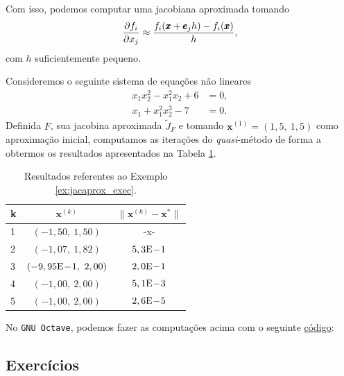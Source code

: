 Com isso, podemos computar uma jacobiana aproximada tomando
\begin{equation}
  \frac{\partial f_i}{\partial x_j} \approx \frac{f_i(\pmb{x}+\pmb{e}_jh) - f_i(\pmb{x})}{h},
\end{equation}
com $h$ suficientemente pequeno.

\begin{ex}\label{ex:jacaprox_exec}
  Consideremos o seguinte sistema de equações não lineares
  \begin{align}
    x_1x_2^2 - x_1^2x_2 + 6 &= 0,\\
    x_1 + x_1^2x_2^3 - 7 &= 0.
  \end{align}
  Definida $F$, sua jacobina aproximada $\tilde{J}_F$ e tomando $\pmb{x}^{(1)} = (1,5,~1,5)$ como aproximação inicial, computamos as iterações do {\it quasi}-método de forma a obtermos os resultados apresentados na Tabela \ref{tab:ex_jacaprox_exec}.

  \begin{table}[h!]
    \centering
    \begin{tabular}{lcc}
      k & $\pmb{x}^{(k)}$ & $\|\pmb{x}^{(k)} - \pmb{x}^*\|$\\\hline
      1 & $(-1,50,~1,50)$ & -x- \\
      2 & $(-1,07,~1,82)$ & $5,3\mathrm{E}\!-\!1$\\
      3 & $(-9,95\mathrm{E}\!-\!1,~2,00)$ & $2,0\mathrm{E}\!-\!1$\\
      4 & $(-1,00,~2,00)$ & $5,1\mathrm{E}\!-\!3$\\
      5 & $(-1,00,~2,00)$ & $2,6\mathrm{E}\!-\!5$\\\hline
    \end{tabular}
    \caption{Resultados referentes ao Exemplo \ref{ex:jacaprox_exec}.}
    \label{tab:ex_jacaprox_exec}
  \end{table}

\ifisoctave
No \verb+GNU Octave+, podemos fazer as computações acima com o seguinte \href{https://github.com/phkonzen/notas/blob/master/src/MatematicaNumerica/cap_snl/dados/ex_jacaprox_exec/ex_jacaprox_exec.m}{código}:

\fi
\end{ex}

\subsection*{Exercícios}

\emconstrucao